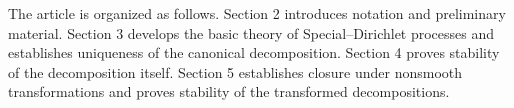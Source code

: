 \documentclass[a4paper,10pt]{article}
\def\P{{\mathbb{P}}}
\begin{document}
\medskip

The article is organized as follows. Section 2 introduces notation and
preliminary material. Section 3 develops the basic theory of
Special--Dirichlet processes and establishes uniqueness of the canonical
decomposition. Section 4 proves stability of the decomposition itself.
Section 5 establishes closure under nonsmooth transformations and proves
stability of the transformed decompositions.


%
%
%
\end{document}
